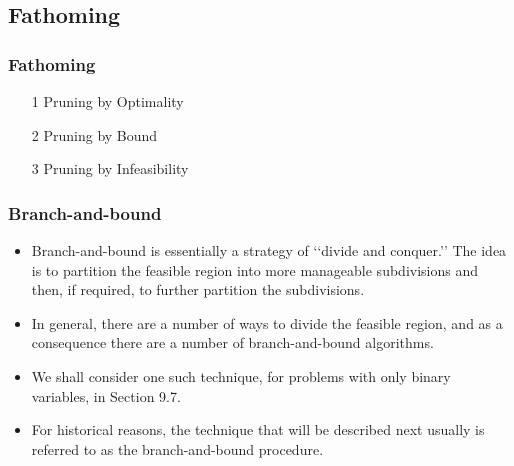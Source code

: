 \documentclass{beamer}
\begin{document}
\subsection{Fathoming}
\begin{frame}
\frametitle{Fathoming}
\Large
\begin{itemize}
\item[1] Pruning by Optimality
\item[2] Pruning by Bound
\item[3] Pruning by Infeasibility
\end{itemize}	
\end{frame}
\begin{frame}
	\frametitle{Branch-and-bound}
\begin{itemize}
\item Branch-and-bound is essentially a strategy of ‘‘divide and conquer.’’ The idea is to partition the feasible
region into more manageable subdivisions and then, if required, to further partition the subdivisions. 
\item In
general, there are a number of ways to divide the feasible region, and as a consequence there are a number of
branch-and-bound algorithms. 

\item We shall consider one such technique, for problems with only binary variables,
in Section 9.7. 
\item For historical reasons, the technique that will be described next usually is referred to as the
branch-and-bound procedure.

\end{itemize}

\end{frame}
\end{document}
